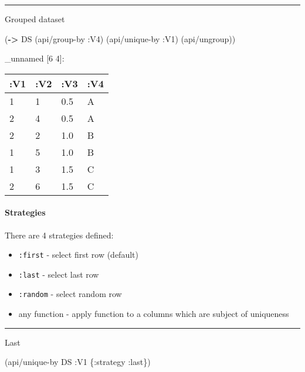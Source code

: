 \documentclass[]{article}
\newenvironment{Shaded}{\begin{snugshade}}{\end{snugshade}}
\newcommand{\AttributeTok}[1]{\textcolor[rgb]{0.77,0.63,0.00}{#1}}
\newcommand{\KeywordTok}[1]{\textcolor[rgb]{0.13,0.29,0.53}{\textbf{#1}}}
\newcommand{\NormalTok}[1]{#1}
\providecommand{\tightlist}{%
  \setlength{\itemsep}{0pt}\setlength{\parskip}{0pt}}
\let\oldparagraph\paragraph
\renewcommand{\paragraph}[1]{\oldparagraph{#1}\mbox{}}
\begin{document}
\begin{center}\rule{0.5\linewidth}{0.5pt}\end{center}

Grouped dataset

\begin{Shaded}
\begin{Highlighting}[]
\NormalTok{(}\KeywordTok{->}\NormalTok{ DS}
\NormalTok{    (api/group-by }\AttributeTok{:V4}\NormalTok{)}
\NormalTok{    (api/unique-by }\AttributeTok{:V1}\NormalTok{)}
\NormalTok{    (api/ungroup))}
\end{Highlighting}
\end{Shaded}

\_unnamed {[}6 4{]}:

\begin{longtable}[]{@{}llll@{}}
\toprule
:V1 & :V2 & :V3 & :V4\tabularnewline
\midrule
\endhead
1 & 1 & 0.5 & A\tabularnewline
2 & 4 & 0.5 & A\tabularnewline
2 & 2 & 1.0 & B\tabularnewline
1 & 5 & 1.0 & B\tabularnewline
1 & 3 & 1.5 & C\tabularnewline
2 & 6 & 1.5 & C\tabularnewline
\bottomrule
\end{longtable}

\hypertarget{strategies}{%
\paragraph{Strategies}\label{strategies}}

There are 4 strategies defined:

\begin{itemize}
\tightlist
\item
  \texttt{:first} - select first row (default)
\item
  \texttt{:last} - select last row
\item
  \texttt{:random} - select random row
\item
  any function - apply function to a columns which are subject of
  uniqueness
\end{itemize}

\begin{center}\rule{0.5\linewidth}{0.5pt}\end{center}

Last

\begin{Shaded}
\begin{Highlighting}[]
\NormalTok{(api/unique-by DS }\AttributeTok{:V1}\NormalTok{ \{}\AttributeTok{:strategy} \AttributeTok{:last}\NormalTok{\})}
\end{Highlighting}
\end{Shaded}
\end{document}
